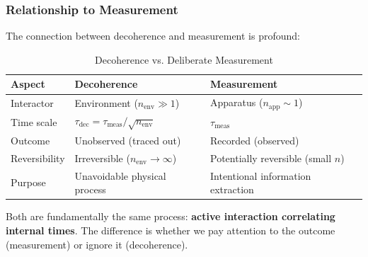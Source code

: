 \subsubsection{Relationship to Measurement}

The connection between decoherence and measurement is profound:

\begin{table}[htbp]
\centering
\caption{Decoherence vs. Deliberate Measurement}
\begin{tabular}{@{}lll@{}}
\toprule
\textbf{Aspect} & \textbf{Decoherence} & \textbf{Measurement} \\
\midrule
Interactor & Environment ($n_{\text{env}} \gg 1$) & Apparatus ($n_{\text{app}} \sim 1$) \\
Time scale & $\tau_{\text{dec}} = \tau_{\text{meas}}/\sqrt{n_{\text{env}}}$ & $\tau_{\text{meas}}$ \\
Outcome & Unobserved (traced out) & Recorded (observed) \\
Reversibility & Irreversible ($n_{\text{env}} \to \infty$) & Potentially reversible (small $n$) \\
Purpose & Unavoidable physical process & Intentional information extraction \\
\bottomrule
\end{tabular}
\label{tab:decoherence_vs_measurement}
\end{table}

Both are fundamentally the same process: \textbf{active interaction correlating internal times}. The difference is whether we pay attention to the outcome (measurement) or ignore it (decoherence).

